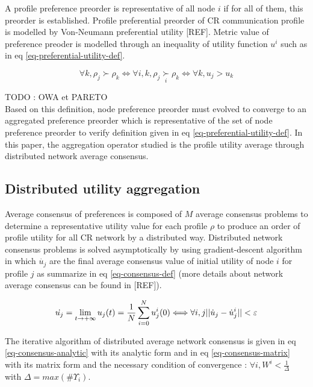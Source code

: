 \documentclass[conference]{IEEEtran}
\newcommand{\preferal}[1]{\underset{#1}{\succ}}
\begin{document}
A profile preference preorder is representative of all node $i$ if for all of them, this preorder is established. Profile preferential preorder of CR communication profile is modelled by Von-Neumann preferential utility [REF].  Metric value of preference preoder is modelled through an inequality of utility function $u^i$ such as in eq \ref{eq-preferential-utility-def}.  

\begin{equation}
\label{eq-preferential-utility-def}
\displaystyle
\forall k, \rho_j \succ \rho_k \Longleftrightarrow \forall i,k,  \rho_j \preferal{i} \rho_k \Longleftrightarrow \forall k, u_j > u_k
\end{equation}

TODO : OWA et PARETO\\

Based on this definition, node preference preorder must evolved to converge to an aggregated preference preorder which is representative of the set of node preference preorder to verify definition given in eq \ref{eq-preferential-utility-def}. In this paper, the aggregation operator studied is the profile utility average through distributed network average consensus.

\subsection{Distributed utility aggregation}
Average consensus of preferences is composed of $M$ average consensus problems to determine a representative utility value for each profile $\rho$ to produce an order of profile utility for all CR network by a distributed way. Distributed network consensus problems is solved asymptotically by using gradient-descent algorithm in which $\dot{u_j}$ are the final average consensus value of initial utility of node $i$ for profile $j$ as summarize in eq \ref{eq-consensus-def} (more details about network average consensus can be found in [REF]). 

\begin{equation}
\label{eq-consensus-def}
\displaystyle
\dot{u_j} =  \lim_{t \to +\infty } u_j(t)  =  {1 \over N } \sum_{i=0}^N u_j^i(0)  \Longleftrightarrow \forall i,j || \dot{u}_j - \dot{u}_j^i || < \varepsilon
\end{equation}

The iterative algorithm of distributed average network consensus is given in eq \ref{eq-consensus-analytic} with its analytic form and in eq \ref{eq-consensus-matrix} with its matrix form and the necessary condition of convergence : $\forall i, W^i < \frac{1}{\Delta}$ with $\Delta = max(\#\Upsilon_i)$.
\end{document}
